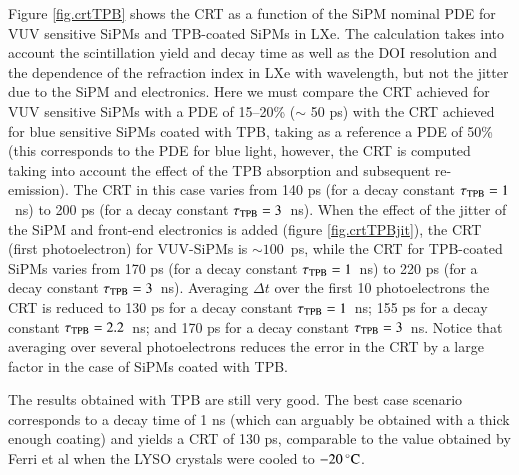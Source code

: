 \documentclass[review]{elsarticle}
\begin{document}
Figure \ref{fig.crtTPB} shows the CRT as a function of the
 SiPM nominal PDE for VUV sensitive SiPMs and TPB-coated SiPMs in LXe. 
 The calculation takes into account the scintillation yield and decay time as well as the DOI resolution and the dependence of the refraction index in LXe with wavelength, but not the jitter due to the SiPM and electronics. 
 Here we must compare the CRT achieved for VUV sensitive SiPMs with a PDE of 15--20\% ($\sim$ 50 ps) with the CRT achieved for blue sensitive SiPMs coated with TPB, taking as a reference a PDE of 50\% (this corresponds to the
 PDE for blue light,  however, the CRT is computed taking into account the effect of the TPB absorption and subsequent re-emission).  The CRT in this case varies from 140 ps (for a decay constant $\tau_{\rm{TPB}} = 1$~ns) to 
 200 ps (for a decay constant $\tau_{\rm{TPB}} = 3$~ns).  When the effect of the jitter of the SiPM and front-end electronics is added (figure \ref{fig.crtTPBjit}), the CRT (first photoelectron) for VUV-SiPMs is $\sim 100$~ps, while the CRT for TPB-coated SiPMs varies from  170 ps (for a decay constant $\tau_{\rm{TPB}} = 1$~ns) to  220 ps (for a decay constant $\tau_{\rm{TPB}} = 3$~ns). Averaging $\Delta t$ over the first 10 photoelectrons  the CRT is reduced to 130 ps for a decay constant $\tau_{\rm{TPB}} = 1$~ns;  155 ps for a decay constant $\tau_{\rm{TPB}} = 2.2$~ns;  and 170 ps for a decay constant $\tau_{\rm{TPB}} = 3$~ns. Notice that averaging over several photoelectrons reduces the error in the CRT by a large factor in the case of SiPMs coated with TPB. 
 
 
 The results obtained with TPB are still very good. The best case scenario corresponds to a decay time of 1 ns
 (which can arguably be obtained with a thick enough coating) and yields a CRT of 130 ps, comparable to the value
 obtained by Ferri et al  \cite{LysoFBK}  when the LYSO crystals were cooled 
to $-20\,^{\circ}{\rm C}$.
    
\end{document}
